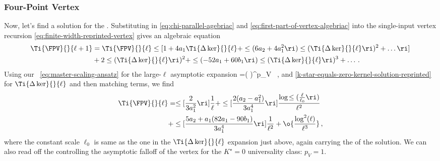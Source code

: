 \subsubsection{Four-Point Vertex}
Now, let's find a solution for the .
Substituting in \eqref{eq:chi-parallel-agebriac} and \eqref{eq:first-part-of-vertex-algebriac} into the single-input vertex recursion \eqref{eq:finite-width-reprinted-vertex} gives an algebraic equation
\begin{align}
\Ti{\FPV}{}{\ell+1}&=\Ti{\FPV}{}{\ell}\le[1+4a_1 \Ti{\Delta\ker}{}{\ell}+\le(6a_2+4a_1^2 \ri) \le(\Ti{\Delta\ker}{}{\ell}\ri)^2+\ldots\ri]\,  \\
&+2 \le(\Ti{\Delta\ker}{}{\ell}\ri)^2+\le(-52a_1+60b_1\ri) \le(\Ti{\Delta\ker}{}{\ell}\ri)^3+\ldots\, .\nonumber
\end{align}
Using our ~\eqref{eq:master-scaling-ansatz} for the large-$\ell$ asymptotic expansion
\be\label{eq:vertex-scaling-ansatz}
\Ti{\FPV}{}{\ell} =\le(  \ri)^{p_V} \, ,
\ee
and \eqref{k-star-equals-zero-kernel-solution-reprinted} for $\Ti{\Delta \ker}{}{\ell}$ and then
matching terms, we find 
\begin{align}\label{eq:Kstar-equals-zero-vertex-solution}
\Ti{\FPV}{}{\ell}&=\le[\frac{2}{3a_1^2}\ri]\frac{1}{\ell}+\le[\frac{2(a_2-a_1^2)}{3 a_1^4}\ri]\frac{\log\!\le(\frac{\ell}{\ell_0}\ri)}{\ell^2}\, \\
&+\le[\frac{5a_2+a_1(82 a_1-90 b_1)}{3 a_1^4}\ri]\frac{1}{\ell^2}+\o{\frac{\log^2(\ell)}{\ell^3}}\, , \nonumber
\end{align}
where the constant scale $\ell_0$ is same as the one in the $\Ti{\Delta\ker}{}{\ell}$ expansion
just above, again carrying the  of the solution.
We can also read off the  controlling the asymptotic falloff of the vertex for the $K^\star=0$ universality class:  
 $p_V=1$.%

